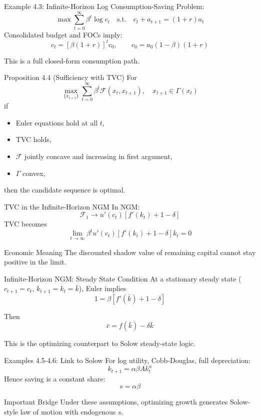 \documentclass[aspectratio=169,10pt]{beamer}
\newcommand{\apxbutton}[1]{\hfill\hyperlink{#1}{\beamerbutton{Appendix}}}
\begin{document}
\begin{frame}{Example 4.3: Infinite-Horizon Log Consumption-Saving}
Problem:
\[
\max\sum_{t=0}^{\infty}\beta^t\log c_t
\quad\text{s.t.}\quad
c_t+a_{t+1}=(1+r)a_t
\]
Consolidated budget and FOCs imply:
\[
c_t=[\beta(1+r)]^t c_0,
\qquad
c_0=a_0(1-\beta)(1+r)
\]

This is a full closed-form consumption path.
\end{frame}

\begin{frame}{Proposition 4.4 (Sufficiency with TVC)}
\hypertarget{m-a6}{}
For
\[
\max_{\{x_{t+1}\}}\sum_{t=0}^{\infty}\beta^t\mathcal{F}(x_t,x_{t+1}),\quad x_{t+1}\in\Gamma(x_t)
\]
if
\begin{itemize}
  \item Euler equations hold at all $t$,
  \item TVC holds,
  \item $\mathcal{F}$ jointly concave and increasing in first argument,
  \item $\Gamma$ convex,
\end{itemize}
then the candidate sequence is optimal.
\apxbutton{a6}
\end{frame}

\begin{frame}{TVC in the Infinite-Horizon NGM}
In NGM:
\[
\mathcal{F}_1 \to u'(c_t)\left[f'(k_t)+1-\delta\right]
\]
TVC becomes
\[
\lim_{t\to\infty}\beta^t u'(c_t)\left[f'(k_t)+1-\delta\right]k_t=0
\]

\begin{block}{Economic Meaning}
The discounted shadow value of remaining capital cannot stay positive in the limit.
\end{block}
\end{frame}

\begin{frame}{Infinite-Horizon NGM: Steady State Condition}
At a stationary steady state ($c_{t+1}=c_t$, $k_{t+1}=k_t=\bar{k}$), Euler implies
\[
1=\beta\left[f'(\bar{k})+1-\delta\right]
\]

Then
\[
\bar{c}=f(\bar{k})-\delta\bar{k}
\]

This is the optimizing counterpart to Solow steady-state logic.
\end{frame}

\begin{frame}{Examples 4.5-4.6: Link to Solow}
For log utility, Cobb-Douglas, full depreciation:
\[
k_{t+1}=\alpha\beta A k_t^{\alpha}
\]
Hence saving is a constant share:
\[
s=\alpha\beta
\]

\begin{block}{Important Bridge}
Under these assumptions, optimizing growth generates Solow-style law of motion with endogenous $s$.
\end{block}
\end{frame}
\end{document}
